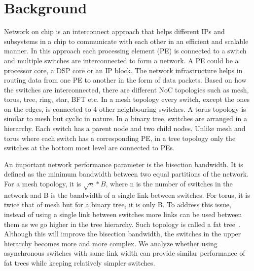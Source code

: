\section{Background}
\label{sec:background}
Network on chip is an interconnect approach that helps different IPs and subsystems in a chip to communicate with each other in an efficient and scalable manner. 
In this approach each processing element (PE) is connected to a switch and multiple switches are interconnected to form a network.
A PE could be a processor core, a DSP core or an IP block.
The network infrastructure helps in routing data from one PE to another in the form of data packets. 
Based on how the switches are interconnected, there are different NoC topologies such as mesh, torus, tree, ring, star, BFT etc.
In a mesh topology every switch, except the ones on the edges, is connected to 4 other neighbouring switches.
A torus topology is similar to mesh but cyclic in nature.
In a binary tree, switches are arranged in a hierarchy.
Each switch has a parent node and two child nodes.
Unlike mesh and torus where each switch has a corresponding PE, in a tree topology only the switches at the bottom most level are connected to PEs.

An important network performance parameter is the bisection bandwidth.
It is defined as the minimum bandwidth between two equal partitions of the network.
For a mesh topology, it is $\sqrt{n}*B$, where n is the number of switches in the network and B is the bandwidth of a single link between switches.
For torus, it is twice that of mesh but for a binary tree, it is only B.
To address this issue, instead of using a single link between switches more links can be used between them as we go higher in the tree hierarchy.
Such topology is called a fat tree~\cite{Leiserson1985}. 
Although this will improve the bisection bandwidth, the switches in the upper hierarchy becomes more and more complex.
We analyze whether using asynchronous switches with same link width can provide similar performance of fat trees while keeping relatively simpler switches.